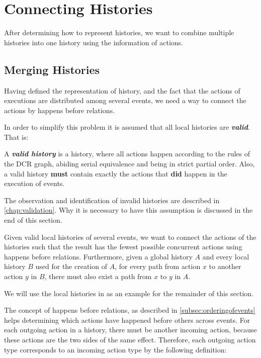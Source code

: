 \chapter{Connecting Histories}\label{chap:connecting-histories}
	After determining how to represent histories, we want to combine multiple histories into one history using the information of actions.
    
    \section{Merging Histories}\label{sec:connecting:merge}
    Having defined the representation of history, and the fact that the actions of executions are distributed among several events, we need a way to connect the actions by happens before relations.

	\newpar In order to simplify this problem it is assumed that all local histories are \textit{\textbf{valid}}. That is:
    
    \begin{definition}
    A \textit{\textbf{valid history}} is a history, where all actions happen according to the rules of the DCR graph, abiding serial equivalence and being in strict partial order. Also, a valid history \textbf{must} contain exactly the actions that \textbf{did} happen in the execution of events.
    \label{def:validhistory}
    \end{definition} 

	\noindent The observation and identification of invalid histories are described in \autoref{chap:validation}. Why it is necessary to have this assumption is discussed in the end of this section.

    \newpar Given valid local histories of several events, we want to connect the actions of the histories such that the result has the fewest possible concurrent actions using happens before relations. Furthermore, given a global history $A$ and every local history $B$ used for the creation of $A$, for every path from action $x$ to another action $y$ in $B$, there must also exist a path from $x$ to $y$ in $A$.
    
    \newpar We will use the local histories in  as an example for the remainder of this section.
    
    \newpar The concept of happens before relations, as described in \autoref{subsec:orderingofevents} helps determining which actions have happened before others across events. For each outgoing action in a history, there must be another incoming action, because these actions are the two sides of the same effect. Therefore, each outgoing action type corresponds to an incoming action type by the following definition:
	
